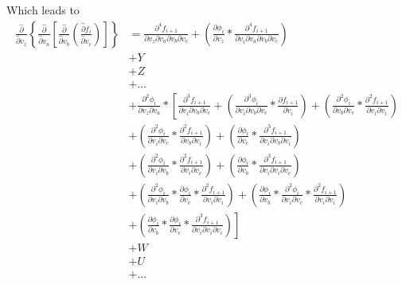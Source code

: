 \documentclass[12pt,letter]{article}
\begin{document}
	Which leads to
	\begin{equation}
	\begin{split}
	\frac{\hat{\partial}}{\hat{\partial} v_z}\left\{	\frac{\hat{\partial}}{\hat{\partial} v_a}\left[
	\frac{\hat{\partial}}{\hat{\partial} v_b}\left(
	\frac{\hat{\partial} f_i}{\hat{\partial} v_c}\right)\right]\right\}
	&= 
	\frac{\partial^4 f_{i+1}}{\partial v_z \partial v_a \partial v_b \partial v_c} +
	\left(\frac{\partial \phi_i}{\partial v_z} * \frac{\partial^4 f_{i+1}}{\partial v_i \partial v_a \partial v_b \partial v_c}\right)
	\\
	&+
	Y
	\\
	&+
	Z
	\\
	&+
	...
	\\
	&+
	\frac{\partial^2 \phi_i}{\partial v_z \partial v_a} * 
	\left[\frac{\partial^3 f_{i+1}}{\partial v_i \partial v_b \partial v_c} + 
	\left(\frac{\partial^3 \phi_i}{\partial v_i \partial v_b \partial v_c} * \frac{\partial f_{i+1}}{\partial v_i}\right) + 
	\left(\frac{\partial^2 \phi_i}{\partial v_b \partial v_c} * \frac{\partial^2 f_{i+1}}{\partial v_i \partial v_i}\right) 
	\right.
	\\
	&
	\left.
	+ \left(\frac{\partial^2 \phi_i}{\partial v_i \partial v_c} * \frac{\partial^2 f_{i+1}}{\partial v_b \partial v_i}\right) + 
	\left(\frac{\partial \phi_i}{\partial v_c} * \frac{\partial^3 f_{i+1}}{\partial v_i \partial v_b \partial v_i}\right) 
	\right.
	\\
	&
	\left.
	+ \left(\frac{\partial^2 \phi_i}{\partial v_i \partial v_b} * \frac{\partial^2 f_{i+1}}{\partial v_i \partial v_c}\right) + 
	\left(\frac{\partial \phi_i}{\partial v_b} * \frac{\partial^3 f_{i+1}}{\partial v_i \partial v_i \partial v_c}\right) 
	\right.
	\\
	&
	\left.
	+ \left(\frac{\partial^2 \phi_i}{\partial v_i \partial v_b} * \frac{\partial \phi_i}{\partial v_c} * \frac{\partial^2 f_{i+1}}{\partial v_i \partial v_i}\right) + 
	\left(\frac{\partial \phi_i}{\partial v_b} * \frac{\partial^2 \phi_i}{\partial v_i \partial v_c} * \frac{\partial^2 f_{i+1}}{\partial v_i \partial v_i}\right) 
	\right.
	\\
	&
	\left.
	+ \left(\frac{\partial \phi_i}{\partial v_b} * \frac{\partial \phi_i}{\partial v_c} * \frac{\partial^3 f_{i+1}}{\partial v_i \partial v_i \partial v_i}\right)\right]
	\\
	&+
	W
	\\
	&+
	U
	\\
	&+
	...
	\end{split}
	\end{equation}
\end{document}
